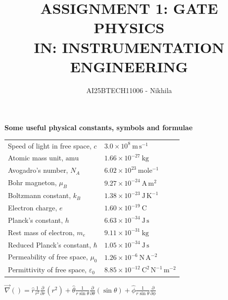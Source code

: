\documentclass[journal,13pt,onecolumn]{IEEEtran}
\begin{document}
\title{
ASSIGNMENT 1: GATE PHYSICS \\
IN: INSTRUMENTATION ENGINEERING}
\author{AI25BTECH11006 - Nikhila }
\maketitle

\renewcommand{\thefigure}{\theenumi}
\renewcommand{\thetable}{\theenumi}

\vspace{6em} 



\noindent\textbf{\large Some useful physical constants, symbols and formulae}


\vspace{6em}

\begin{tabular}{ l l }
Speed of light in free space, $c$ & $3.0 \times 10^8\ \mathrm{m\,s^{-1}}$ \\
Atomic mass unit, $\mathrm{amu}$ & $1.66 \times 10^{-27}\ \mathrm{kg}$ \\
Avogadro's number, $N_A$ & $6.02 \times 10^{23}\ \mathrm{mole^{-1}}$ \\
Bohr magneton, $\mu_B$ & $9.27 \times 10^{-24}\ \mathrm{A\,m^2}$ \\
Boltzmann constant, $k_B$ & $1.38 \times 10^{-23}\ \mathrm{J\,K^{-1}}$ \\
Electron charge, $e$ & $1.60 \times 10^{-19}\ \mathrm{C}$ \\
Planck's constant, $h$ & $6.63 \times 10^{-34}\ \mathrm{J\,s}$ \\
Rest mass of electron, $m_e$ & $9.11 \times 10^{-31}\ \mathrm{kg}$ \\
Reduced Planck's constant, $\hbar$ & $1.05 \times 10^{-34}\ \mathrm{J\,s}$ \\
Permeability of free space, $\mu_0$ & $1.26 \times 10^{-6}\ \mathrm{N\,A^{-2}}$ \\
Permittivity of free space, $\varepsilon_0$ & $8.85 \times 10^{-12}\ \mathrm{C^2\,N^{-1}\,m^{-2}}$
\end{tabular}

\vspace{6em}
\noindent $\vec{\nabla}() = \hat{r} \frac{1}{r^2} \frac{\partial}{\partial r} \left( r^2 \right)
+ \hat{\theta} \frac{1}{r \sin\theta} \frac{\partial}{\partial \theta} (\sin\theta)
+ \hat{\phi} \frac{1}{r\sin\theta} \frac{\partial}{\partial\phi}$

\vspace{1em}
\end{document}
